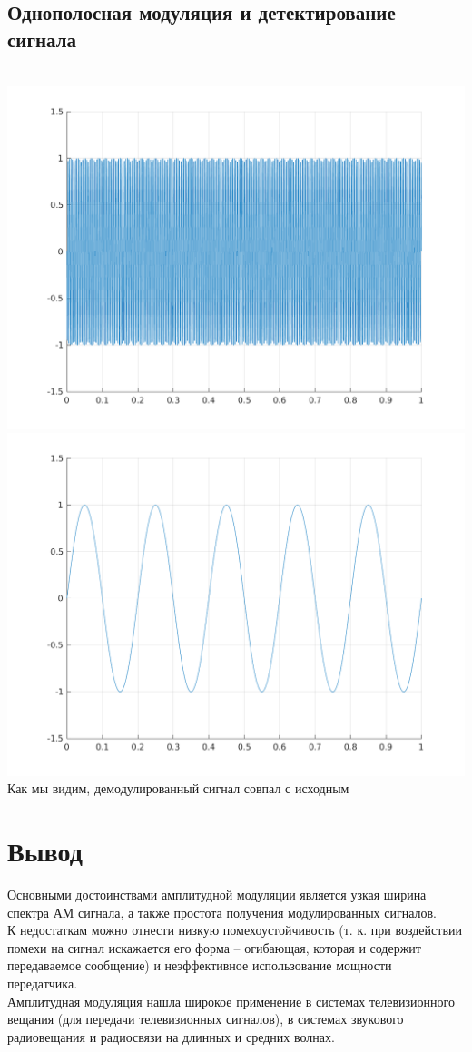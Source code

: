 \documentclass[a4paper]{article}
\begin{document}
\subsection{Однополосная модуляция и детектирование сигнала}
\\
\includegraphics[scale=0.45]{lab4/figures/figure_7.png}
\includegraphics[scale=0.45]{lab4/figures/figure_8.png}\\
Как мы видим, демодулированный сигнал совпал с исходным\\
\section{Вывод}
 Основными достоинствами амплитудной модуляции является узкая ширина спектра АМ сигнала, а также простота получения модулированных сигналов.\\
К недостаткам можно отнести низкую помехоустойчивость (т. к. при воздействии помехи на сигнал искажается его форма -- огибающая, которая и содержит передаваемое сообщение) и неэффективное использование мощности передатчика.\\
Амплитудная модуляция нашла широкое применение в системах телевизионного вещания (для передачи телевизионных сигналов), в системах звукового радиовещания и радиосвязи на длинных и средних волнах.
\end{document}
